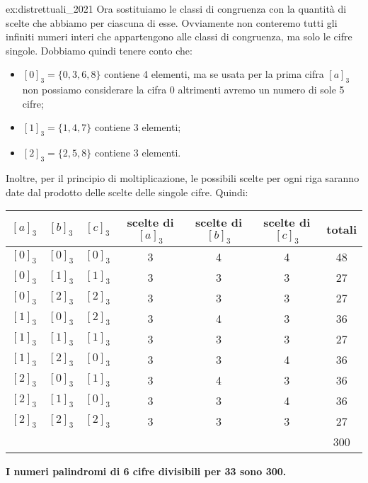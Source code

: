 \begin{soluzione}{ex:distrettuali_2021}
    Ora sostituiamo le classi di congruenza con la quantità di scelte che abbiamo per ciascuna di esse.
    Ovviamente non conteremo tutti gli infiniti numeri interi che appartengono alle classi di congruenza, ma solo le
    cifre singole.
    Dobbiamo quindi tenere conto che:
    \begin{itemize}
        \item $[0]_3 = \{0, 3, 6, 8\}$ contiene 4 elementi, ma se usata per la prima cifra $[a]_3$ non possiamo
        considerare la cifra 0 altrimenti avremo un numero di sole 5 cifre;
        \item $[1]_3 = \{1, 4, 7\}$ contiene 3 elementi;
        \item $[2]_3 = \{2, 5, 8\}$ contiene 3 elementi.
    \end{itemize}

    Inoltre, per il principio di moltiplicazione, le possibili scelte per ogni riga saranno date dal prodotto delle
    scelte delle singole cifre.
    Quindi:

    \begin{table}[H]
        \label{tab:distrettuali_2019_2}
        \centering
        \begin{tabular}{ccccccc}
            \toprule
            $[a]_3$ & $[b]_3$ & $[c]_3$ & scelte di $[a]_3$ & scelte di $[b]_3$ & scelte di $[c]_3$ & totali \\
            \midrule
            $[0]_3$ & $[0]_3$ & $[0]_3$ & 3 & 4 & 4 & 48 \\
            $[0]_3$ & $[1]_3$ & $[1]_3$ & 3 & 3 & 3 & 27 \\
            $[0]_3$ & $[2]_3$ & $[2]_3$ & 3 & 3 & 3 & 27 \\
            $[1]_3$ & $[0]_3$ & $[2]_3$ & 3 & 4 & 3 & 36 \\
            $[1]_3$ & $[1]_3$ & $[1]_3$ & 3 & 3 & 3 & 27 \\
            $[1]_3$ & $[2]_3$ & $[0]_3$ & 3 & 3 & 4 & 36 \\
            $[2]_3$ & $[0]_3$ & $[1]_3$ & 3 & 4 & 3 & 36 \\
            $[2]_3$ & $[1]_3$ & $[0]_3$ & 3 & 3 & 4 & 36 \\
            $[2]_3$ & $[2]_3$ & $[2]_3$ & 3 & 3 & 3 & 27 \\
            \midrule
            & & & & & & 300 \\
            \bottomrule
        \end{tabular}
    \end{table}

    \bigskip
    \textbf{I numeri palindromi di 6 cifre divisibili per 33 sono 300.}
\end{soluzione}

